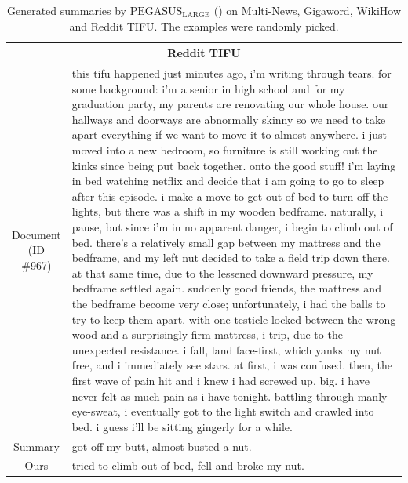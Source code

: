 \begin{table}[h!]
\begin{tabular}{c|p{}}
  \multicolumn{2}{c}{Reddit TIFU} \\\hline
  \makecell{Document\\(ID \#967)} & this tifu happened just minutes ago, i'm writing through tears. for some background: i'm a senior in high school and for my graduation party, my parents are renovating our whole house. our hallways and doorways are abnormally skinny so we need to take apart everything if we want to move it to almost anywhere. i just moved into a new bedroom, so furniture is still working out the kinks since being put back together. onto the good stuff! i'm laying in bed watching netflix and decide that i am going to go to sleep after this episode. i make a move to get out of bed to turn off the lights, but there was a shift in my wooden bedframe. naturally, i pause, but since i'm in no apparent danger, i begin to climb out of bed. there's a relatively small gap between my mattress and the bedframe, and my left nut decided to take a field trip down there. at that same time, due to the lessened downward pressure, my bedframe settled again. suddenly good friends, the mattress and the bedframe become very close; unfortunately, i had the balls to try to keep them apart. with one testicle locked between the wrong wood and a surprisingly firm mattress, i trip, due to the unexpected resistance. i fall, land face-first, which yanks my nut free, and i immediately see stars. at first, i was confused. then, the first wave of pain hit and i knew i had screwed up, big. i have never felt as much pain as i have tonight. battling through manly eye-sweat, i eventually got to the light switch and crawled into bed. i guess i'll be sitting gingerly for a while. \\\hline
  Summary & got off my butt, almost busted a nut. \\\hline
  Ours & tried to climb out of bed, fell and broke my nut. \\\hline
  
  \end{tabular}
  \caption{Generated summaries by $\text{PEGASUS}_{\text{LARGE}}$ (\gnews) on Multi-News, Gigaword, WikiHow and Reddit TIFU. The examples were randomly picked.}
  \label{tab:qualitative_2}
\end{table}




